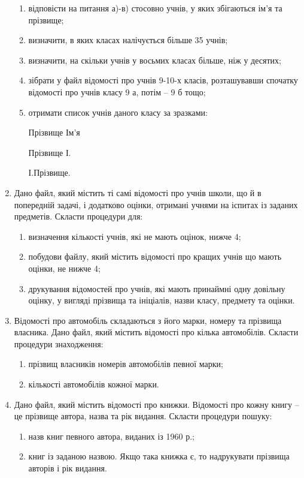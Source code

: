 \documentclass[]{article}
\makeatletter
\newcommand{\xslalph}[1]{\expandafter\@xslalph\csname c@#1\endcsname}
\newcommand{\@xslalph}[1]{%
    \ifcase#1\or а\or б\or в\or г\or д\or e\or є\or ж\or з\or i%
    \or й\or к\or л\or м\or н\or о\or п\or р\or с\or т%
    \or у\or ф\or х\or ц\or ч\or ш\or ю\or я\or аа\or бб\or вв %
    \else\@ctrerr\fi%
}
\makeatother
\begin{document}
\begin{enumerate}
\begin{enumerate}[label=\xslalph*)]
\item відповісти на питання а)-в) стосовно учнів, у яких збігаються ім'я та
прізвище;

\item визначити, в яких класах налічується більше 35 учнів;

\item визначити, на скільки учнів у восьмих класах більше, ніж у десятих;

\item зібрати у файл відомості про учнів 9-10-х класів, розташувавши
спочатку відомості про учнів класу 9 а, потім -- 9 б тощо;

\item отримати список учнів даного класу за зразками:

Прізвище Ім'я

Прізвище І.

І.Прізвище.
\end{enumerate}

\item
Дано файл, який містить ті самі відомості про учнів школи, що й в
попередній задачі, і додатково оцінки, отримані учнями на іспитах із
заданих предметів. Скласти процедури для:
\begin{enumerate}[label=\xslalph*)]
\item
визначення кількості учнів, які не мають оцінок, нижче 4;

\item побудови файлу, який містить відомості про кращих учнів що мають
оцінки, не нижче 4;

\item друкування відомостей про учнів, які мають принаймні одну довільну
оцінку, у вигляді прізвища та ініціалів, назви класу, предмету та
оцінки.
\end{enumerate}

\item
Відомості про автомобіль складаються з його марки, номеру та прізвища
власника. Дано файл, який містить відомості про кілька автомобілів.
Скласти процедури знаходження:
\begin{enumerate}[label=\xslalph*)]
\item
 прізвищ власників номерів автомобілів певної марки;

\item кількості автомобілів кожної марки.
\end{enumerate}

\item
Дано файл, який містить відомості про книжки. Відомості про кожну книгу
-- це прізвище автора, назва та рік видання. Скласти процедури пошуку:
\begin{enumerate}[label=\xslalph*)]
\item
 назв книг певного автора, виданих із 1960 р.;
\item
 книг із заданою назвою. Якщо така книжка є, то надрукувати прізвища
авторів і рік видання.
\end{enumerate}


\end{enumerate}
\end{document}
